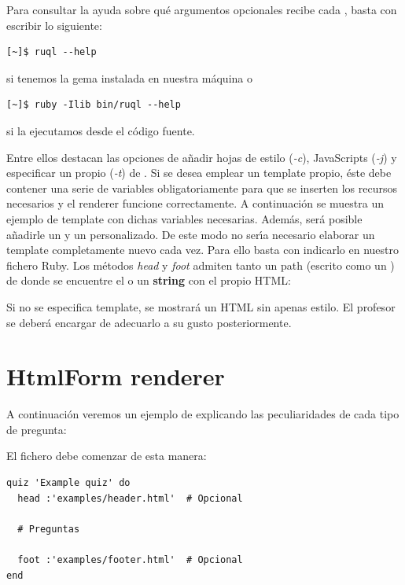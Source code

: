Para consultar la ayuda sobre qu\'e argumentos opcionales recibe cada , basta con escribir lo siguiente:
\begin{verbatim}
[~]$ ruql --help
\end{verbatim}
si tenemos la gema instalada en nuestra m\'aquina o
\begin{verbatim}
[~]$ ruby -Ilib bin/ruql --help
\end{verbatim}
si la ejecutamos desde el c\'odigo fuente.
\bigskip

Entre ellos destacan las opciones de a\~{n}adir hojas de estilo (\textit{-c}), JavaScripts (\textit{-j}) y especificar un propio  (\textit{-t}) de \ceis{\ref{apend1:erb}}.
Si se desea emplear un template propio, \'este debe contener una serie de variables obligatoriamente para que se inserten los recursos necesarios y el renderer funcione
correctamente. A continuaci\'on se muestra un ejemplo de template con dichas variables necesarias. Adem\'as, ser\'a posible a\~{n}adirle un  y un  personalizado. 
De este modo no ser\'{\i}a necesario elaborar un template completamente nuevo cada vez. Para ello basta con indicarlo en nuestro fichero Ruby. Los m\'etodos \textit{head} y
\textit{foot} admiten tanto un path (escrito como un ) de donde se encuentre el   o un {\bfseries string} con el propio HTML:



Si no se especifica template, se mostrar\'a un HTML sin apenas estilo. El profesor se deber\'a encargar de adecuarlo a su gusto posteriormente. 

\section{HtmlForm renderer}
\label{Apendice2:htmlform}

A continuaci\'on veremos un ejemplo de  explicando las peculiaridades de cada tipo de pregunta:

El fichero  debe comenzar de esta manera:
\begin{lstlisting}
quiz 'Example quiz' do
  head :'examples/header.html'  # Opcional
  
  # Preguntas
  
  foot :'examples/footer.html'  # Opcional
end
\end{lstlisting}
\bigskip

